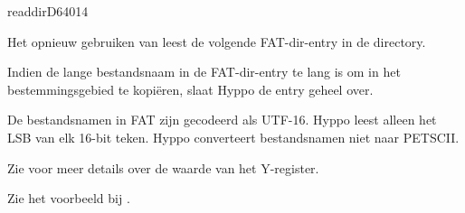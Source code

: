 \begin{hyppotrap}{readdir}{D640}{14}
\item [Nawerkingen:]  Het opnieuw gebruiken van  leest de volgende FAT-dir-entry in de directory.
\item [Foutcodes:]      
\item [Opmerkingen:]  Indien de lange bestandsnaam in de FAT-dir-entry te lang is om in het  bestemmingsgebied te kopiëren, slaat Hyppo de entry geheel over.

  De bestandsnamen in FAT zijn gecodeerd als UTF-16. Hyppo leest alleen het LSB  van elk 16-bit teken. Hyppo converteert bestandsnamen niet naar  PETSCII.

  Zie  voor meer details over de waarde van het  Y-register.\item [Geschiedenis:]
\item [Voorbeeld:]  Zie het voorbeeld bij .
\end{hyppotrap}


